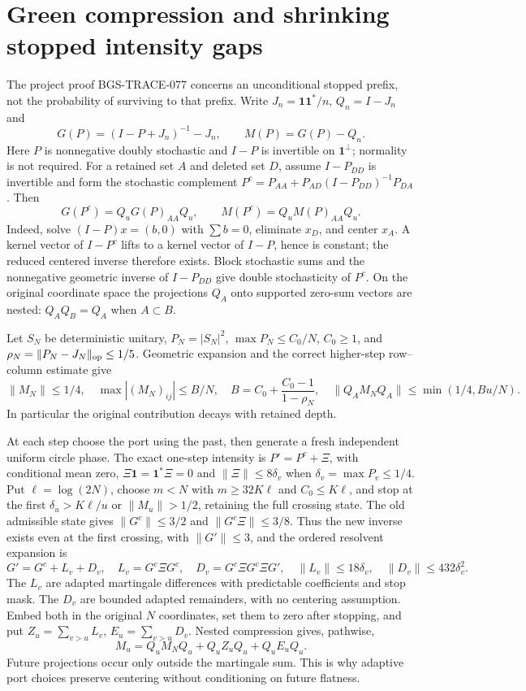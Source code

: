 \section{Green compression and shrinking stopped intensity gaps}
\label{sec:green-compression-20261013}

The project proof BGS-TRACE-077 concerns an unconditional stopped prefix,
not the probability of surviving to that prefix. Write
$J_n=\mathbf1\mathbf1^*/n$, $Q_n=I-J_n$ and
\[
 G(P)=(I-P+J_n)^{-1}-J_n,\qquad M(P)=G(P)-Q_n.
\]
Here $P$ is nonnegative doubly stochastic and $I-P$ is invertible on
$\mathbf1^\perp$; normality is not required. For a retained set $A$ and
deleted set $D$, assume $I-P_{DD}$ is invertible and form the stochastic
complement $P^c=P_{AA}+P_{AD}(I-P_{DD})^{-1}P_{DA}$. Then
\[
 G(P^c)=Q_uG(P)_{AA}Q_u,\qquad
 M(P^c)=Q_uM(P)_{AA}Q_u.                         \tag{GC.1}
\]
Indeed, solve $(I-P)x=(b,0)$ with $\sum b=0$, eliminate $x_D$,
and center $x_A$. A kernel vector of $I-P^c$ lifts to a kernel vector
of $I-P$, hence is constant; the reduced centered inverse therefore
exists. Block stochastic sums and the nonnegative geometric inverse of
$I-P_{DD}$ give double stochasticity of $P^c$.
On the original coordinate space the projections $Q_A$ onto supported
zero-sum vectors are nested: $Q_AQ_B=Q_A$ when $A\subset B$.

Let $S_N$ be deterministic unitary, $P_N=|S_N|^2$,
$\max P_N\le C_0/N$, $C_0\ge1$, and
$\rho_N=\|P_N-J_N\|_{\rm op}\le1/5$. Geometric expansion and the
correct higher-step row--column estimate give
\[
 \|M_N\|\le1/4,\quad \max|(M_N)_{ij}|\le B/N,
 \quad B=C_0+\frac{C_0-1}{1-\rho_N},\quad
 \|Q_AM_NQ_A\|\le\min(1/4,Bu/N).                 \tag{GC.2}
\]
In particular the original contribution decays with retained depth.

At each step choose the port using the past, then generate a fresh
independent uniform circle phase. The exact one-step intensity is
$P'=P^c+\Xi$, with conditional mean zero,
$\Xi\mathbf1=\mathbf1^*\Xi=0$ and $\|\Xi\|\le8\delta_v$ when
$\delta_v=\max P_v\le1/4$. Put $\ell=\log(2N)$, choose
$m<N$ with $m\ge32K\ell$ and $C_0\le K\ell$, and stop at the first
$\delta_u>K\ell/u$ or $\|M_u\|>1/2$, retaining the full crossing state.
The old admissible state gives $\|G^c\|\le3/2$ and
$\|G^c\Xi\|\le3/8$. Thus the new inverse exists even at the first
crossing, with $\|G'\|\le3$, and the ordered resolvent expansion is
\[
 G'=G^c+L_v+D_v,\quad L_v=G^c\Xi G^c,\quad
 D_v=G^c\Xi G^c\Xi G',\quad
 \|L_v\|\le18\delta_v,\quad \|D_v\|\le432\delta_v^2.       \tag{GC.3}
\]
The $L_v$ are adapted martingale differences with predictable
coefficients and stop mask. The $D_v$ are bounded adapted remainders,
with no centering assumption. Embed both in the original $N$ coordinates,
set them to zero after stopping, and put $Z_u=\sum_{v>u}L_v$,
$E_u=\sum_{v>u}D_v$. Nested compression gives, pathwise,
\[
 M_u=Q_uM_NQ_u+Q_uZ_uQ_u+Q_uE_uQ_u.              \tag{GC.4}
\]
Future projections occur only outside the martingale sum. This is why
adaptive port choices preserve centering without conditioning on future
flatness.


